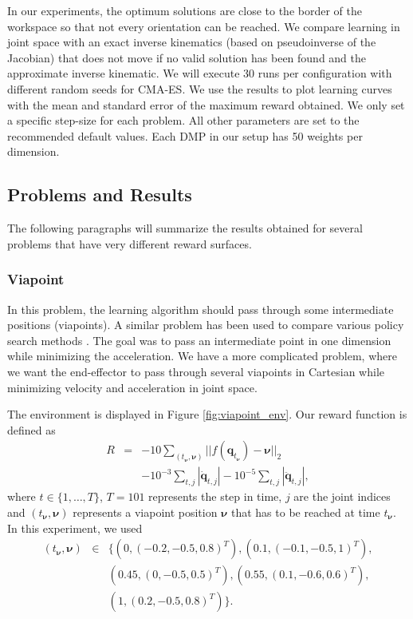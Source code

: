 \documentclass{article}
\begin{document}
In our experiments, the optimum solutions are close to the border of the
workspace so that not every orientation can be reached. We compare learning
in joint space with an exact inverse kinematics (based on pseudoinverse of
the Jacobian) that does not move if no valid solution has been found and
the approximate inverse kinematic.
We will execute 30 runs per configuration with different random seeds for
CMA-ES. We use the results to plot learning curves with the mean and
standard error of the maximum reward obtained.
We only set a specific step-size for each problem. All other parameters
are set to the recommended default values.
Each DMP in our setup has 50 weights per dimension.

\subsection{Problems and Results}

The following paragraphs will summarize the results obtained for several
problems that have very different reward surfaces.

\subsubsection{Viapoint}

In this problem, the learning algorithm should pass through some
intermediate positions (viapoints).
A similar problem has been used to compare various policy search methods
\cite{Kober2010,Peters2006}. The goal was to pass an intermediate point
in one dimension while minimizing the acceleration.
We have a more complicated problem, where we want the end-effector to pass
through several viapoints in Cartesian while minimizing velocity and
acceleration in joint space.

The environment is displayed in Figure \ref{fig:viapoint_env}.
Our reward function is defined as
\begin{eqnarray*}
R &=& -10 \sum_{(t_{\boldsymbol{\nu}},\boldsymbol{\nu})} ||f(\boldsymbol{q}_{t_{\boldsymbol{\nu}}}) - \boldsymbol{\nu}||_2\\
&&- 10^{-3} \sum_{t,j} |\dot{\boldsymbol{q}}_{t,j}|
  - 10^{-5} \sum_{t,j} |\ddot{\boldsymbol{q}}_{t,j}|,
\end{eqnarray*}
where $t \in \lbrace 1, \ldots, T \rbrace$, $T=101$ represents the step in
time, $j$ are the joint indices and $(t_{\boldsymbol{\nu}}, \boldsymbol{\nu})$
represents a viapoint position $\boldsymbol{\nu}$ that has to be reached
at time $t_{\boldsymbol{\nu}}$. In this experiment, we used
\begin{eqnarray*}
(t_{\boldsymbol{\nu}}, \boldsymbol{\nu}) &\in& \lbrace
(0, (-0.2, -0.5, 0.8)^T), (0.1, (-0.1, -0.5, 1)^T),\\
&& (0.45, (0, -0.5, 0.5)^T), (0.55, (0.1, -0.6, 0.6)^T),\\
&& (1, (0.2, -0.5, 0.8)^T) \rbrace.
\end{eqnarray*}
\end{document}
